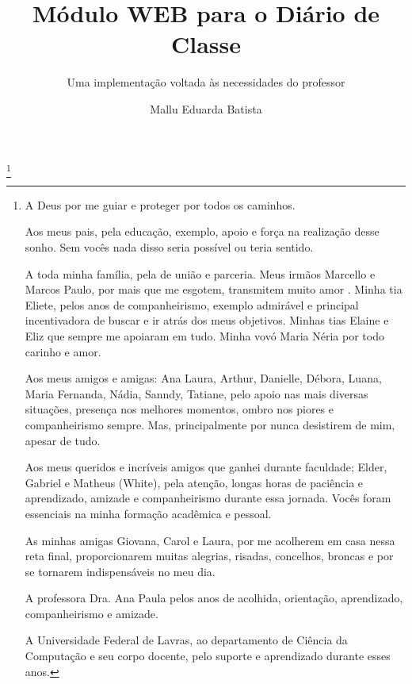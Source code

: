 \documentclass{uflamon}          %
\author{Mallu Eduarda Batista}
\title{Módulo WEB para o Diário de Classe}
\subtitle{Uma implementação voltada às necessidades do professor}
\date{}
\begin{document}
\maketitle



\thanks{
A Deus por me guiar e proteger por todos os caminhos.
	
Aos meus pais, pela educação, exemplo, apoio e força na realização desse sonho. Sem vocês nada disso seria possível ou teria sentido. 

A toda minha família, pela de união e parceria. Meus irmãos Marcello e Marcos Paulo, por mais que me esgotem, transmitem muito amor . Minha tia Eliete, pelos anos de companheirismo, exemplo admirável e principal incentivadora de buscar e ir atrás dos meus objetivos. Minhas tias Elaine e Eliz que sempre me apoiaram em tudo. Minha vovó Maria Néria por todo carinho e amor.

Aos meus amigos e amigas: Ana Laura, Arthur, Danielle, Débora, Luana,  Maria Fernanda, Nádia, Sanndy, Tatiane, pelo apoio nas mais diversas situações, presença nos melhores momentos, ombro nos piores e companheirismo sempre. Mas, principalmente por nunca desistirem de mim, apesar de tudo. 

Aos meus queridos e incríveis amigos que ganhei durante faculdade; Elder, Gabriel e Matheus (White), pela atenção, longas horas de paciência e aprendizado, amizade  e companheirismo durante essa jornada. Vocês foram essenciais na minha formação acadêmica e pessoal.  

As minhas amigas Giovana, Carol e Laura, por me acolherem em casa nessa reta final, proporcionarem muitas alegrias, risadas, concelhos, broncas e por se tornarem indispensáveis no meu dia.

A professora Dra. Ana Paula pelos anos de acolhida, orientação, aprendizado, companheirismo e amizade.

A Universidade Federal de Lavras, ao departamento de Ciência da Computação e seu corpo docente, pelo suporte e aprendizado durante esses anos.

}      

\end{document}
